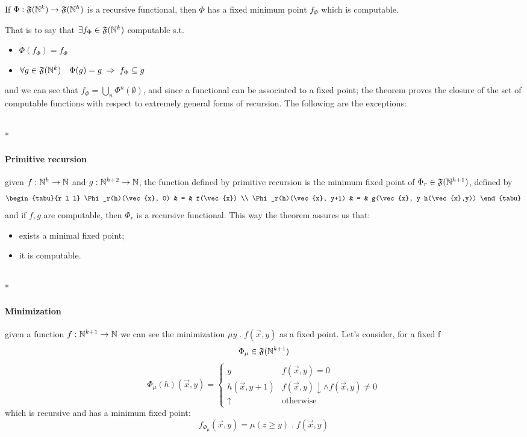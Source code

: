\begin{theorem}\label{th:first-recursion}
  If $\Phi : \mathfrak{F}(\mathbb{N}^k) \rightarrow \mathfrak{F}(\mathbb{N}^h)$ is
  a recursive functional, then $\Phi$ has a fixed minimum point
  $f_\Phi$ which is computable.
\end{theorem}

That is to say that $\exists f_\Phi \in \mathfrak{F}(\mathbb{N}^k)$
computable s.t.
\begin{itemize}
\item $\Phi(f_\Phi) = f_\Phi$
\item
  $\forall g \in \mathfrak{F}(\mathbb{N}^k) \quad \Phi(g) = g \; \Rightarrow
  \; f_\Phi \subseteq g$
\end{itemize}
and we can see that $f_\Phi = \bigcup\limits_n
\Phi^{n}(\emptyset)$, and since a functional can be associated to a
fixed point; the theorem proves the closure of the set of computable
functions with respect to extremely general forms of recursion. The
following are the exceptions:

\mbox{}\\*
\paragraph{\textbf{Primitive recursion}}
given $f : \mathbb{N}^h \rightarrow \mathbb{N}$ and
$g : \mathbb{N}^{h+2} \rightarrow \mathbb{N}$, the function defined by primitive
recursion is the minimum fixed point of
$\Phi_r \in \mathfrak{F}(\mathbb{N}^{h+1})$, defined by
\[
  \begin{tabu}{r l l}
    \Phi_r(h)(\vec{x}, 0) & = & f(\vec{x}) \\
    \Phi_r(h)(\vec{x}, y+1) & = & g(\vec{x}, y h(\vec{x},y))
  \end{tabu}
\]
and if $f,g$ are computable, then $\Phi_r$ is a recursive
functional. This way the theorem assures us that:
\begin{itemize}
\item exists a minimal fixed point;
\item it is computable.
\end{itemize}

\mbox{}\\*
\paragraph{\textbf{Minimization}}
given a function $f: \mathbb{N}^{k+1} \rightarrow \mathbb{N}$ we can see the
minimization $\mu y \; . \; f(\vec{x}, y)$ as a fixed point. Let's
consider, for a fixed f
\[
  \Phi_\mu \in \mathfrak{F}(\mathbb{N}^{k+1})
\]
\[
  \Phi_\mu(h)(\vec{x}, y) = \begin{cases}
    y & f(\vec{x},y) = 0 \\
    h(\vec{x}, y+1) & f(\vec{x}, y)\downarrow \land f(\vec{x}, y) \neq 0 \\
    \uparrow & \mbox{otherwise}
  \end{cases}
\]
which is recursive and has a minimum fixed point:
\[
  f_{\Phi_\mu}(\vec{x}, y) = \mu (z \geq y) \; . \; f(\vec{x}, y)
\]

